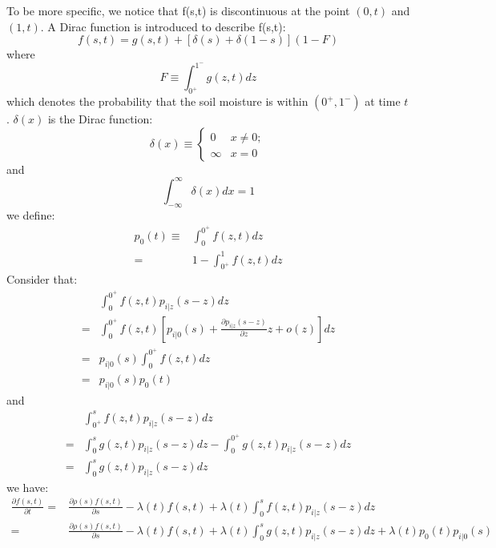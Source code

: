 \documentclass[11pt]{article}
\begin{document}
 To be more specific, we notice that f(s,t) is discontinuous at the point $(0,t)$ and $(1,t)$. A Dirac function is introduced to describe f(s,t):
 \begin{equation}
 f(s,t)=g(s,t)+[\delta(s)+\delta(1-s)](1-F)
 \end{equation} 
 where
 \begin{equation}
 F\equiv\int_{0^+}^{1^-} g(z,t)dz
 \end{equation}
 which denotes the probability that the soil moisture is within $(0^+,1^-)$ at time $t$ . $\delta (x)$ is the Dirac function:
 \begin{equation}
 \delta(x)\equiv
 \begin{cases}
 0&x\neq0;\\\infty&x=0
 \end{cases}
 \end{equation}
 and
 \begin{equation}
 \int_{-\infty}^{\infty} \delta(x)dx=1
 \end{equation}
 we define:
 \begin{equation}
 \begin{split}
 p_0(t)\equiv&\int_0^{0^+} f(z,t)dz\\=&1-\int_{0^+}^1 f(z,t)dz
 \end{split}
 \end{equation}
 Consider that:
 \begin{equation}
 \begin{split}
 &\int_{0}^{0^+} f(z,t)p_{i|z}(s-z)dz\\=&\int_{0}^{0^+} f(z,t)[p_{i|0}(s)+\frac{\partial p_{i|z}(s-z)}{\partial z}z+o(z)]dz
 \\=&p_{i|0}(s)\int_{0}^{0^+} f(z,t)dz
 \\=&p_{i|0}(s)p_0(t)
 \end{split}
 \end{equation}
 and
 \begin{equation}
 \begin{split}
 &\int_{0^+}^{s} f(z,t)p_{i|z}(s-z)dz\\=&\int_{0}^{s} g(z,t)p_{i|z}(s-z)dz-\int_{0}^{0^+} g(z,t)p_{i|z}(s-z)dz\\=&\int_{0}^{s} g(z,t)p_{i|z}(s-z)dz
 \end{split}
 \end{equation}
 we have:
 \begin{equation}
 \begin{split}
 \frac{\partial{f(s,t)}}{\partial t}=&\frac{\partial{\rho(s)f(s,t)}}{\partial s}-\lambda(t)f(s,t)+\lambda(t)\int_{0}^{s} f(z,t)p_{i|z}(s-z)dz\\=&\frac{\partial{\rho(s)f(s,t)}}{\partial s}-\lambda(t)f(s,t)+\lambda(t)\int_{0}^{s} g(z,t)p_{i|z}(s-z)dz+\lambda(t)p_0(t)p_{i|0}(s)
 \end{split}
 \end{equation}
\end{document}
